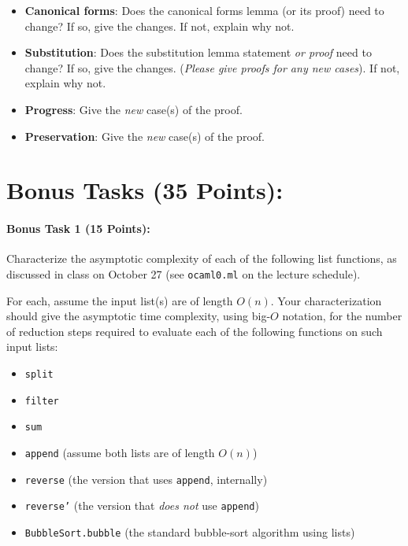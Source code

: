 \documentclass{article}
\newcommand{\stepsto}{\longrightarrow}
\begin{document}
\begin{itemize}

\item \textbf{Canonical forms}: Does the canonical forms lemma (or its proof) need to
  change? If so, give the changes. If not, explain why not.

\item \textbf{Substitution}: Does the substitution lemma statement
  \emph{or proof} need to change? If so, give the changes.
  (\emph{Please give proofs for any new cases}).  If not, explain why
  not.

\item \textbf{Progress}: Give the \emph{new} case(s) of the proof.

\item \textbf{Preservation}: Give the \emph{new} case(s) of the proof.
\end{itemize}

\section*{Bonus Tasks (35 Points):}

\paragraph{Bonus Task 1 (15 Points):}
Characterize the asymptotic complexity of each of the following list
functions, as discussed in class on October 27 (see \texttt{ocaml0.ml}
on the lecture schedule).

For each, assume the input list(s) are of length $O(n)$.  Your
characterization should give the asymptotic time complexity, using
big-$O$ notation, for the number of reduction steps required to
evaluate each of the following functions on such input lists:
\begin{itemize}
\item \texttt{split}
\item \texttt{filter}
\item \texttt{sum}
\item \texttt{append} (assume both lists are of length $O(n)$)
\item \texttt{reverse} (the version that uses \texttt{append}, internally)
\item \texttt{reverse'} (the version that \emph{does not} use \texttt{append})
\item \texttt{BubbleSort.bubble} (the standard bubble-sort algorithm using lists)
\end{itemize}
\end{document}
